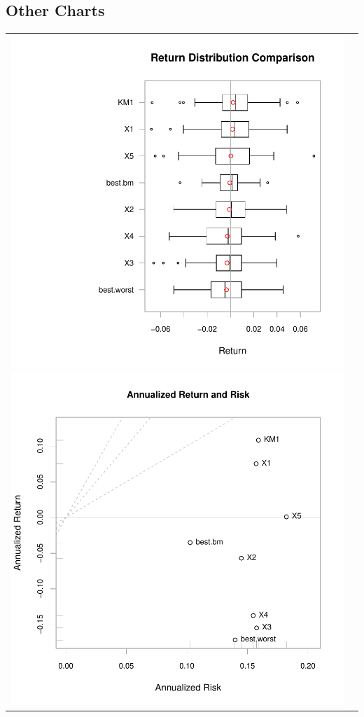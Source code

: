 \documentclass{article}
\begin{document}
\subsection{Other Charts}
\begin{tabular}{cc}
\includegraphics{graphics/plot-020}
\includegraphics{graphics/plot-021}
\end{tabular}
\end{document}
